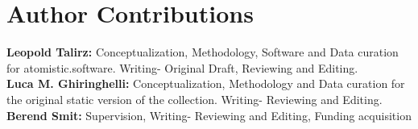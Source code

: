 \documentclass[9pt,review,pubversion]{livecoms}
\begin{document}









\section*{Author Contributions}
%
\textbf{Leopold Talirz:} Conceptualization, Methodology, Software and Data curation for atomistic.software. Writing- Original Draft, Reviewing and Editing.\\
\textbf{Luca M. Ghiringhelli:} Conceptualization, Methodology and Data curation for the original static version of the collection. Writing- Reviewing and Editing.\\
\textbf{Berend Smit:} Supervision, Writing- Reviewing and Editing, Funding acquisition
\end{document}
